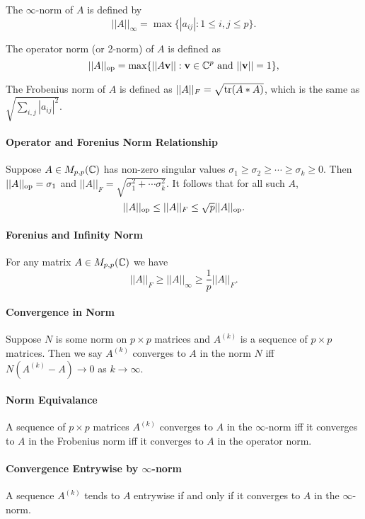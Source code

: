The \(\infty\)-norm of \(A\) is defined by
\[||A||_\infty = \max\{|a_{ij}|: 1 \leq i,j \leq p\}.\]

The operator norm (or 2-norm) of \(A\) is defined as
    \[||A||_{\mathrm{op}} = \max\{||A\mathbf{v}||: \mathbf{v} \in \mathbb{C}^p \text{ and } ||\mathbf{v}|| = 1\},\]

The Frobenius norm of \(A\) is defined as \(||A||_F = \sqrt{\tr(A*A)}\), which is the same as \(\sqrt{\sum_{i,j}|a_{ij}|^2}\).

\paragraph{Operator and Forenius Norm Relationship}
Suppose \(A \in M_{p,p}(\mathbb{C})\) has non-zero singular values \(\sigma_1 \geq \sigma_2 \geq \cdots \geq \sigma_k \geq 0\).
Then \(||A||_{\mathrm{op}} = \sigma_1\) and \(||A||_F = \sqrt{\sigma_1^2 + \cdots \sigma_k^2}\). It follows that for all such \(A\),
\[||A||_{\mathrm{op}} \leq ||A||_F \leq \sqrt{p}||A||_{\mathrm{op}}.\]

\paragraph{Forenius and Infinity Norm}
For any matrix \(A \in M_{p,p}(\mathbb{C})\) we have
\[||A||_F \geq ||A||_\infty \geq \frac{1}{p}||A||_F.\]

\paragraph{Convergence in Norm}
Suppose \(N\) is some norm on \(p \times p\) matrices and \(A^{(k)}\) is a sequence of \(p \times p\) matrices. Then we say \(A^(k)\) converges to \(A\) in the norm \(N\) iff \(N(A^{(k)} - A) \to 0\) as \(k \to \infty\).

\paragraph{Norm Equivalance}
A sequence of \(p \times p\) matrices \(A^{(k)}\) converges to \(A\) in the \(\infty\)-norm iff it converges to \(A\) in the Frobenius norm iff it converges to \(A\) in the operator norm.

\paragraph{Convergence Entrywise by \(\infty\)-norm}
A sequence \(A^{(k)}\) tends to \(A\) entrywise if and only if it converges to \(A\) in the \(\infty\)-norm.

